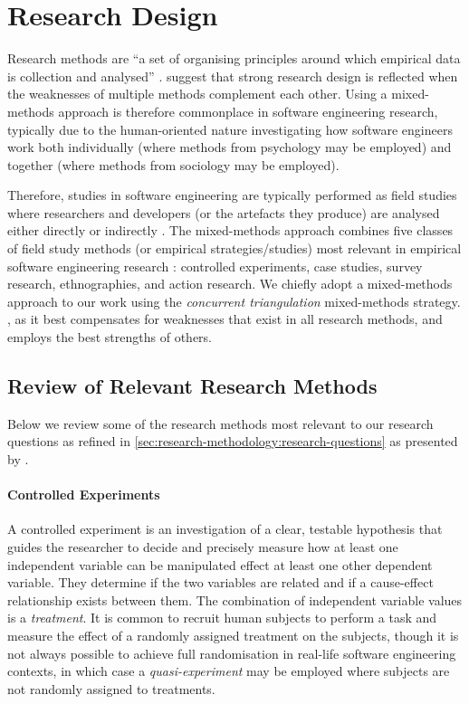 \section{Research Design}
\label{sec:research-methodology:review}

Research methods are ``a set of organising principles around which empirical data is collection and analysed'' \citep{Easterbrook:2007ws}. \citet{Creswell:2017vn} suggest that strong research design is reflected when the weaknesses of multiple methods complement each other. Using a mixed-methods approach is therefore commonplace in software engineering research, typically due to the human-oriented nature investigating how software engineers work both individually (where methods from psychology may be employed) and together (where methods from sociology may be employed). 

Therefore, studies in software engineering are typically performed as field studies where researchers and developers (or the artefacts they produce) are analysed either directly or indirectly \citep{Singer:2007tu}. The mixed-methods approach combines five classes of field study methods (or empirical strategies/studies) most relevant in empirical software engineering research \citep{Easterbrook:2007ws, Wohlin:2012bu, Juristo:2013vj}: controlled experiments, case studies, survey research, ethnographies, and action research. We chiefly adopt a mixed-methods approach to our work using the \textit{concurrent triangulation} mixed-methods strategy. , as it best compensates for weaknesses that exist in all research methods, and employs the best strengths of others.



\subsection{Review of Relevant Research Methods}
\label{ssec:research-methodology:review:methods}

Below we review some of the research methods most relevant to our research questions as refined in \cref{sec:research-methodology:research-questions} as presented by \citet{Easterbrook:2007ws}.

\paragraph{Controlled Experiments}
A controlled experiment is an investigation of a clear, testable hypothesis that guides the researcher to decide and precisely measure how at least one independent variable can be manipulated effect at least one other dependent variable. They determine if the two variables are related and if a cause-effect relationship exists between them. The combination of independent variable values is a \textit{treatment}. It is common to recruit human subjects to perform a task and measure the effect of a randomly assigned treatment on the subjects, though it is not always possible to achieve full randomisation in real-life software engineering contexts, in which case a \textit{quasi-experiment} may be employed where subjects are not randomly assigned to treatments.

